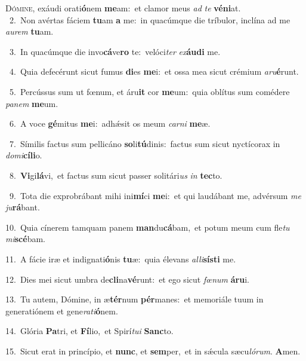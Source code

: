 \lettrine{\initial\textcolor{\initialcolor}{D}}{ómine,} exáudi orati\-\textbf{ó}\-nem \textbf{me}\-am:~\star et clamor meus \textit{ad} \textit{te} \textbf{vé}\-\textbf{ni}at.\\
{\numbfont\textcolor{\numbcolor}{~2.}}~Non avértas fáciem \textbf{tu}\-am \textbf{a} me:~\star in quacúmque die tríbulor, inclína ad me \textit{au}\-\textit{rem} \textbf{tu}\-am.\par
{\numbfont\textcolor{\numbcolor}{~3.}}~In quacúmque die invo\-\textbf{cá}\-ve\textbf{ro} te:~\star velóci\textit{ter} \textit{ex}\-\textbf{áu}\textbf{di} me.\par
{\numbfont\textcolor{\numbcolor}{~4.}}~Quia defecérunt sicut fumus \textbf{di}\-es \textbf{me}\-i:~\star et ossa mea sicut crémium \textit{a}\-\textit{ru}\textbf{é}runt.\par
{\numbfont\textcolor{\numbcolor}{~5.}}~Percússus sum ut fœnum, et áru\textbf{it} cor \textbf{me}\-um:~\star quia oblítus sum comédere \textit{pa}\-\textit{nem} \textbf{me}\-um.\par
{\numbfont\textcolor{\numbcolor}{~6.}}~A voce \textbf{gé}\-mitus \textbf{me}\-i:~\star adhǽsit os meum \textit{car}\-\textit{ni} \textbf{me}\-æ.\par
{\numbfont\textcolor{\numbcolor}{~7.}}~Símilis factus sum pellicáno \textbf{so}\-li\-\textbf{tú}\-dinis:~\star factus sum sicut nyctícorax in \textit{do}\-\textit{mi}\textbf{cí}\textbf{li}o.\par
{\numbfont\textcolor{\numbcolor}{~8.}}~\-\textbf{Vi}\-gi\-\textbf{lá}\-vi,~\star et factus sum sicut passer solitári\textit{us} \textit{in} \textbf{tec}\-to.\par
{\numbfont\textcolor{\numbcolor}{~9.}}~Tota die exprobrábant mihi ini\-\textbf{mí}\-ci \textbf{me}\-i:~\star et qui laudábant me, advérsum \textit{me} \textit{ju}\-\textbf{rá}bant.\par
{\numbfont\textcolor{\numbcolor}{10.}}~Quia cínerem tamquam panem \textbf{man}\-du\-\textbf{cá}\-bam,~\star et potum meum cum fle\textit{tu} \textit{mi}\-\textbf{scé}bam.\par
{\numbfont\textcolor{\numbcolor}{11.}}~A fácie iræ et indignati\-\textbf{ó}\-nis \textbf{tu}\-æ:~\star quia élevans \textit{al}\-\textit{li}\textbf{sís}\textbf{ti} me.\par
{\numbfont\textcolor{\numbcolor}{12.}}~Dies mei sicut umbra de\-\textbf{cli}\-na\-\textbf{vé}\-runt:~\star et ego sicut \textit{fœ}\-\textit{num} \textbf{á}\-\textbf{ru}i.\par
{\numbfont\textcolor{\numbcolor}{13.}}~Tu autem, Dómine, in æ\-\textbf{tér}\-num \textbf{pér}\-manes:~\star et memoriále tuum in generatiónem et gene\-\textit{ra}\-\textit{ti}\textbf{ó}nem.\par
{\numbfont\textcolor{\numbcolor}{14.}}~Glória \textbf{Pa}\-tri, et \textbf{Fí}\-lio,~\star et Spirí\-\textit{tu}\-\textit{i} \textbf{Sanc}\-to.\par
{\numbfont\textcolor{\numbcolor}{15.}}~Sicut erat in princípio, et \textbf{nunc}\-, et \textbf{sem}\-per,~\star et in sǽcula sæcu\-\textit{ló}\-\textit{rum}. \textbf{A}\-men.\par
